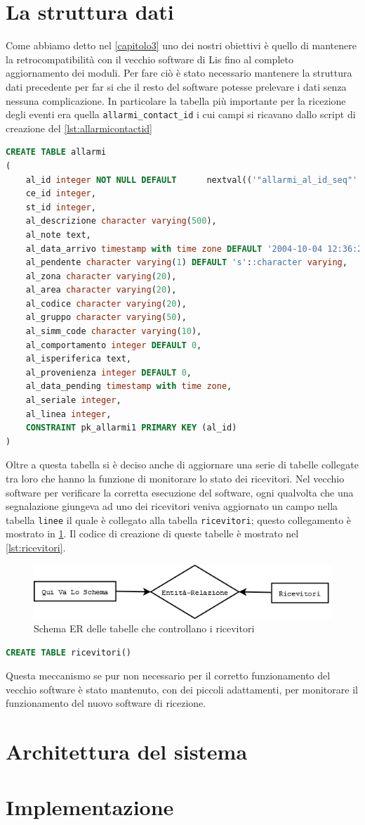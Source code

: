 \section{La struttura dati}
Come abbiamo detto nel \chaptername \ref{capitolo3} uno dei nostri obiettivi è quello di mantenere la retrocompatibilità con il vecchio software di Lis fino al completo aggiornamento dei moduli. Per fare ciò è stato necessario mantenere la struttura dati precedente per far si che il resto del software potesse prelevare i dati senza nessuna complicazione. In particolare la tabella più importante per la ricezione degli eventi era quella \texttt{allarmi\_contact\_id} i cui campi si ricavano dallo script di creazione del \lstname \ref{lst:allarmicontactid}
\begin{lstlisting}[language=SQL,caption=Tabella allarmi\_contact\_id,label=lst:allarmicontactid]
CREATE TABLE allarmi
(
	al_id integer NOT NULL DEFAULT 		nextval(('"allarmi_al_id_seq"'::text)::regclass),
	ce_id integer,
	st_id integer,
	al_descrizione character varying(500),
	al_note text,
	al_data_arrivo timestamp with time zone DEFAULT '2004-10-04 12:36:22.272563+02'::timestamp with time zone,
	al_pendente character varying(1) DEFAULT 's'::character varying,
	al_zona character varying(20),
	al_area character varying(20),
	al_codice character varying(20),
	al_gruppo character varying(50),
	al_simm_code character varying(10),
	al_comportamento integer DEFAULT 0,
	al_isperiferica text,
	al_provenienza integer DEFAULT 0,
	al_data_pending timestamp with time zone,
	al_seriale integer,
	al_linea integer,
	CONSTRAINT pk_allarmi1 PRIMARY KEY (al_id)
)
\end{lstlisting}
Oltre a questa tabella si è deciso anche di aggiornare una serie di tabelle collegate tra loro che hanno la funzione di monitorare lo stato dei ricevitori. Nel vecchio software per verificare la corretta esecuzione del software, ogni qualvolta che una segnalazione giungeva ad uno dei ricevitori veniva aggiornato un campo nella tabella \texttt{linee} il quale è collegato alla tabella \texttt{ricevitori}; questo collegamento è mostrato in \figurename \ref{fig:erricevitori}.
Il codice di creazione di queste tabelle è mostrato nel \lstname \ref{lst:ricevitori}.
\begin{figure}
	\centering
	\includegraphics[width=0.7\linewidth]{pictures/erricevitori.png}
	\caption{Schema ER delle tabelle che controllano i ricevitori}\label{fig:erricevitori}
\end{figure}
\begin{lstlisting}[language=SQL,caption=Tabelle ricevitori,label=lst:ricevitori]
	CREATE TABLE ricevitori()
\end{lstlisting}
Questa meccanismo se pur non necessario per il corretto funzionamento del vecchio software è stato mantenuto, con dei piccoli adattamenti, per monitorare il funzionamento del nuovo software di ricezione.
\section{Architettura del sistema}
\section{Implementazione}